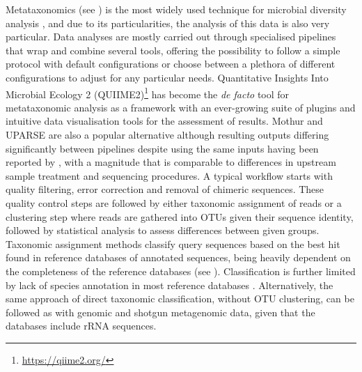 Metataxonomics (see ) is the most widely used technique for microbial diversity analysis \citep{hilton_metataxonomic_2016}, and due to its particularities, the analysis of this data is also very particular. Data analyses are mostly carried out through specialised pipelines that wrap and combine several tools, offering the possibility to follow a simple protocol with default configurations or choose between a plethora of different configurations to adjust for any particular needs. Quantitative Insights Into Microbial Ecology 2 (QUIIME2)\footnote{\url{https://qiime2.org/}} \citep{bolyen_reproducible_2019} has become the \textit{de facto} tool for metataxonomic analysis as a framework with an ever-growing suite of plugins and intuitive data visualisation tools for the assessment of results. Mothur \citep{schloss_introducing_2009} and UPARSE \citep{edgar_uparse_2013} are also a popular alternative although resulting outputs differing significantly between pipelines despite using the same inputs having been reported by \cite{marizzoni_comparison_2020}, with a magnitude that is comparable to differences in upstream sample treatment and sequencing procedures.  A typical workflow starts with quality filtering, error correction and removal of chimeric sequences. These quality control steps are followed by either taxonomic assignment of reads or a clustering step where reads are gathered into OTUs given their sequence identity, followed by statistical analysis to assess differences between given groups. Taxonomic assignment methods classify query sequences based on the best hit found in reference databases of annotated sequences, being heavily dependent on the completeness of the reference databases (see ). Classification is further limited by lack of species annotation in most reference databases \citep{westcott_novo_2015}. Alternatively, the same approach of direct taxonomic classification, without OTU clustering, can be followed as with genomic and shotgun metagenomic data, given that the databases include rRNA sequences.

